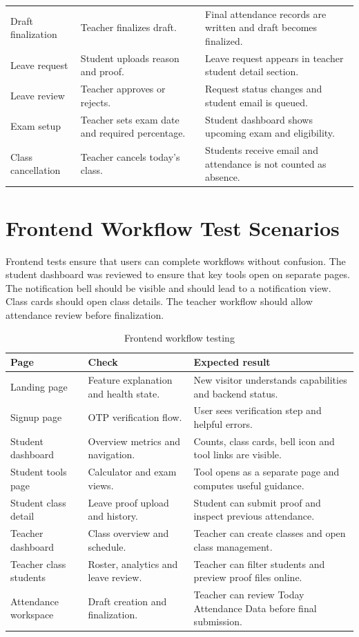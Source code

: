 \begin{longtable}{p{3.3cm} p{4.4cm} p{5.8cm}}
Draft finalization & Teacher finalizes draft. & Final attendance records are written and draft becomes finalized.\\
Leave request & Student uploads reason and proof. & Leave request appears in teacher student detail section.\\
Leave review & Teacher approves or rejects. & Request status changes and student email is queued.\\
Exam setup & Teacher sets exam date and required percentage. & Student dashboard shows upcoming exam and eligibility.\\
Class cancellation & Teacher cancels today's class. & Students receive email and attendance is not counted as absence.\\
\bottomrule
\end{longtable}

\section{Frontend Workflow Test Scenarios}

Frontend tests ensure that users can complete workflows without confusion. The student dashboard was reviewed to ensure that key tools open on separate pages. The notification bell should be visible and should lead to a notification view. Class cards should open class details. The teacher workflow should allow attendance review before finalization.

\begin{table}[H]
\centering
\caption{Frontend workflow testing}
\label{tab:frontend-testing}
\begin{tabularx}{\textwidth}{p{3.5cm} X X}
\toprule
\textbf{Page} & \textbf{Check} & \textbf{Expected result}\\
\midrule
Landing page & Feature explanation and health state. & New visitor understands capabilities and backend status.\\
Signup page & OTP verification flow. & User sees verification step and helpful errors.\\
Student dashboard & Overview metrics and navigation. & Counts, class cards, bell icon and tool links are visible.\\
Student tools page & Calculator and exam views. & Tool opens as a separate page and computes useful guidance.\\
Student class detail & Leave proof upload and history. & Student can submit proof and inspect previous attendance.\\
Teacher dashboard & Class overview and schedule. & Teacher can create classes and open class management.\\
Teacher class students & Roster, analytics and leave review. & Teacher can filter students and preview proof files online.\\
Attendance workspace & Draft creation and finalization. & Teacher can review Today Attendance Data before final submission.\\
\bottomrule
\end{tabularx}
\end{table}

